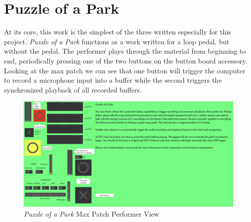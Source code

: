 \section{Puzzle of a Park}
At its core, this work is the simplest of the three written especially for this project. \textit{Puzzle of a Park} functions as a work written for a loop pedal, but without the pedal. The performer plays through the material from beginning to end, periodically pressing one of the two buttons on the button board accessory. Looking at the max patch we can see that one button will trigger the computer to record a microphone input into a buffer while the second triggers the synchronized playback of all recorded buffers. 

\begin{figure}
    \centering
    \includegraphics[scale=0.2]{diagrams/maxPatches/puzzlePresentation.jpg}
    \caption{\textit{Puzzle of a Park} Max Patch Performer View}
    \label{fig:puzzlePatchPres}
\end{figure}

